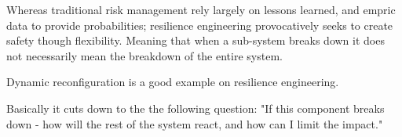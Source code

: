 Whereas traditional risk management rely largely on lessons learned, and empric data to provide probabilities; resilience engineering provocatively seeks to create safety though flexibility. Meaning that when a sub-system breaks down it does not necessarily mean the breakdown of the entire system.

Dynamic reconfiguration is a good example on resilience engineering.

Basically it cuts down to the the following question: "If this component breaks down - how will the rest of the system react, and how can I limit the impact."


